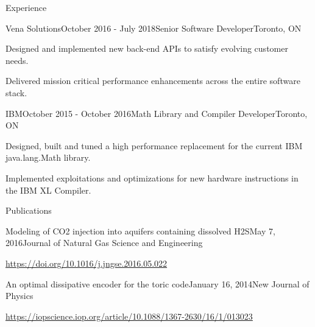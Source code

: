 \documentclass{resume} %
\begin{document}
\begin{rSection}{Experience}

\begin{rSubsection}{Vena Solutions}{October 2016 - July 2018}{Senior Software Developer}{Toronto, ON}
\item Designed and implemented new back-end APIs to satisfy evolving customer needs.
\item Delivered mission critical performance enhancements across the entire software stack.
\end{rSubsection}


\begin{rSubsection}{IBM}{October 2015 - October 2016}{Math Library and Compiler Developer}{Toronto, ON}
\item Designed, built and tuned a high performance replacement for the current IBM java.lang.Math library.
\item Implemented exploitations and optimizations for new hardware instructions in the IBM XL Compiler.
\end{rSubsection}

\end{rSection}


\begin{rSection}{Publications}

\begin{rSubsection}{Modeling of CO2 injection into aquifers containing dissolved H2S}{May 7, 2016}{Journal of Natural Gas Science and Engineering}{}
\item \href{https://doi.org/10.1016/j.jngse.2016.05.022}{https://doi.org/10.1016/j.jngse.2016.05.022}
\end{rSubsection}

\begin{rSubsection}{An optimal dissipative encoder for the toric code}{January 16, 2014}{New Journal of Physics}{}
\item \href{https://iopscience.iop.org/article/10.1088/1367-2630/16/1/013023}{https://iopscience.iop.org/article/10.1088/1367-2630/16/1/013023}
\end{rSubsection}

\end{rSection}





\end{document}
